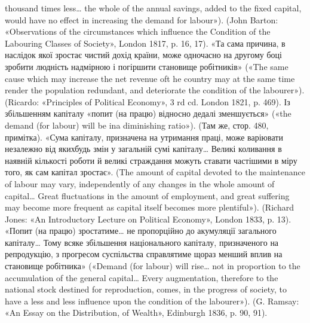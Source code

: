 thousand times less\dots{} the whole of the annual savings, added to the fixed
capital, would have no effect in increasing the demand for labour»). (John
Barton: «Observations of the circumstances which influence the Condition
of the Labouring Classes of Society», London 1817, p. 16, 17). «Та
сама причина, в наслідок якої зростає чистий дохід країни, може одночасно
на другому боці зробити людність надмірною і погіршити становище
робітників» («The same cause which may increase the net revenue oft he country
may at the same time render the population redundant, and deteriorate
the condition of the labourer»). (Ricardo: «Principles of Political Economy»,
3 rd cd. London 1821, p. 469). Із збільшенням капіталу «попит (на
працю) відносно дедалі зменшується» («the demand (for labour) will be ina diminishing
ratio»). (Там же, стор. 480, примітка). «Сума капіталу, призначена
на утримання праці, може варіювати незалежно від якихбудь змін
у загальній сумі капіталу\dots{} Великі коливання в наявній кількості роботи
й великі страждання можуть ставати частішими в міру того, як сам капітал
зростає». (The amount of capital devoted to the maintenance of labour
may vary, independently of any changes in the whole amount of capital\dots{}
Great fluctuations in the amount of employment, and great suffering may
become more frequent as capital itself becomes more plentiful»). (Richard
Jones: «An Introductory Lecture on Political Economy», London 1833, p. 13).
«Попит (на працю) зростатиме\dots{} не пропорційно до акумуляції загального
капіталу\dots{} Тому всяке збільшення національного капіталу, призначеного
на репродукцію, з прогресом суспільства справлятиме щораз
менший вплив на становище робітника» («Demand (for labour) will rise\dots{}
not in proportion to the accumulation of the general capital\dots{} Every
augmentation, therefore to the national stock destined for reproduction,
comes, in the progress of society, to have a less and less influence upon the
condition of the labourer»). (G. Ramsay: «An Essay on the Distribution,
of Wealth», Edinburgh 1836, p. 90, 91).
